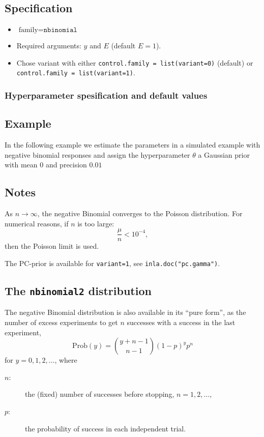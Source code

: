 \documentclass[a4paper,11pt]{article}
\begin{document}
\subsection*{Specification}

\begin{itemize}
\item $\text{family}=\texttt{nbinomial}$
\item Required arguments: $y$ and $E$ (default $E=1$).
\item Chose variant with either
    \verb|control.family = list(variant=0)| (default) or\\
    \verb|control.family = list(variant=1)|.
\end{itemize}

\subsubsection*{Hyperparameter spesification and default values}



\subsection*{Example}

In the following example we estimate the parameters in a simulated
example with negative binomial responses and assign the hyperparameter
$\theta$ a Gaussian prior with mean $0$ and precision $0.01$


\subsection*{Notes}

As $n\rightarrow\infty$, the negative Binomial converges to the
Poisson distribution. For numerical reasons, if $n$ is too large:
\begin{displaymath}
    \frac{\mu}{n} < 10^{-4},
\end{displaymath}
then the Poisson limit is used.

The PC-prior is available for \verb|variant=1|, see
\verb|inla.doc("pc.gamma")|.

\clearpage


\subsection*{The \texttt{nbinomial2} distribution}

The negative Binomial distribution is also available in its ``pure
form'', as the number of excess experiments to get $n$ successes with
a success in the last experiment,
\begin{displaymath}
    \text{Prob}(y) = {y + n -1 \choose n-1} (1-p)^{y} p^{n}
\end{displaymath}
for $y=0, 1, 2, \ldots$, where
\begin{description}
\item[$n$:] the (fixed) number of successes before stopping,
    $n=1, 2, \ldots$,
\item[$p$:] the probability of success in each independent trial.
\end{description}
\end{document}
